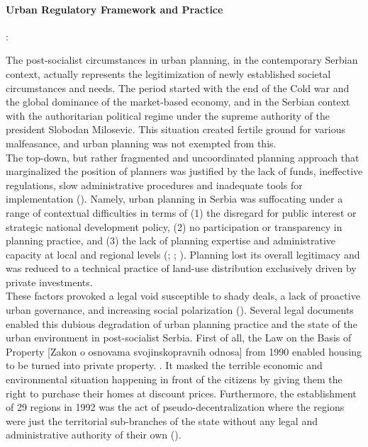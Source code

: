 \documentclass[11pt]{report}
\begin{document}
\paragraph{Urban Regulatory Framework and Practice}:

The post-socialist circumstances in urban planning, in the contemporary Serbian context, actually represents the legitimization of newly established societal circumstances and needs. The period started with the end of the Cold war and the global dominance of the market-based economy, and in the Serbian context with the authoritarian political regime under the supreme authority of the president Slobodan Milosevic. This situation created fertile ground for various malfeasance, and urban planning was not exempted from this.
\\

The top-down, but rather fragmented and uncoordinated planning approach that marginalized the position of planners was justified by the lack of funds, ineffective regulations, slow administrative procedures and inadequate tools for implementation
(\href{Peric}{\citealt{peric_evolution_2016}}). 
Namely, urban planning in Serbia was suffocating under a range of contextual difficulties in terms of (1) the disregard for public interest or strategic national development policy, (2) no participation or transparency in planning practice, and (3) the lack of planning expertise and administrative capacity at local and regional levels (\href{Stojkov}{\citealt{stojkov_neue_1998}}; \href{Vujosevic}{\citealt{vujosevic_planiranje_2003}}; \href{Vujosevic}{ \citealt{vujosevic_planning_2006}}).
Planning lost its overall legitimacy and was reduced to a technical practice of land-use distribution exclusively driven by private investments. 
\\

These factors provoked a legal void susceptible to shady deals, a lack of proactive urban governance, and increasing social polarization (\href{Tsenkova}{\citealt{tsenkova_beyond_2006}}). 
Several legal documents enabled this dubious degradation of urban planning practice and the state of the urban environment in post-socialist Serbia.
First of all, the Law on the Basis of Property [Zakon o osnovama svojinskopravnih odnosa] from 1990 enabled housing to be turned into private property. . It masked the terrible economic and environmental situation happening in front of the citizens by giving them the right to purchase their homes at discount prices. Furthermore, the establishment of 29 regions in 1992 was the act of pseudo-decentralization where the regions were just the territorial sub-branches of the state without any legal and administrative authority of their own (\href{Vujosevic}{\citealt{vujosevic_regionalizam_2015}}).
\\
\end{document}

